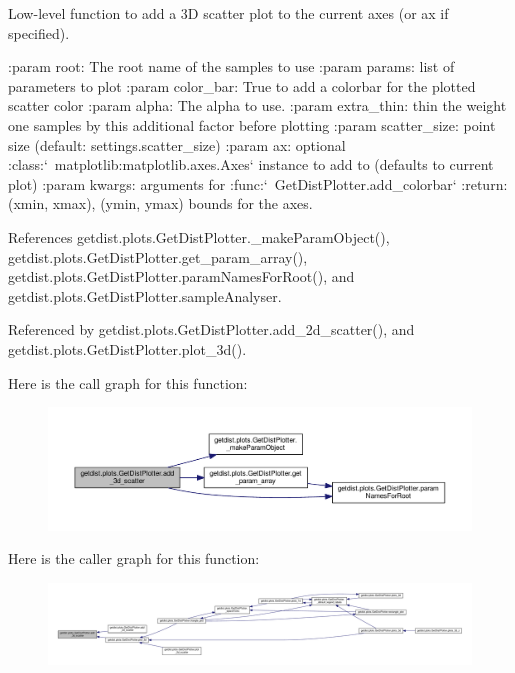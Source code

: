 \begin{DoxyVerb}Low-level function to add a 3D scatter plot to the current axes (or ax if specified).

:param root: The root name of the samples to use
:param params:  list of parameters to plot
:param color_bar: True to add a colorbar for the plotted scatter color
:param alpha: The alpha to use.
:param extra_thin: thin the weight one samples by this additional factor before plotting
:param scatter_size: point size (default: settings.scatter_size)
:param ax: optional :class:`~matplotlib:matplotlib.axes.Axes` instance to add to (defaults to current plot)
:param kwargs: arguments for :func:`~GetDistPlotter.add_colorbar`
:return: (xmin, xmax), (ymin, ymax) bounds for the axes.
\end{DoxyVerb}
 

References getdist.\+plots.\+Get\+Dist\+Plotter.\+\_\+make\+Param\+Object(), getdist.\+plots.\+Get\+Dist\+Plotter.\+get\+\_\+param\+\_\+array(), getdist.\+plots.\+Get\+Dist\+Plotter.\+param\+Names\+For\+Root(), and getdist.\+plots.\+Get\+Dist\+Plotter.\+sample\+Analyser.



Referenced by getdist.\+plots.\+Get\+Dist\+Plotter.\+add\+\_\+2d\+\_\+scatter(), and getdist.\+plots.\+Get\+Dist\+Plotter.\+plot\+\_\+3d().

Here is the call graph for this function\+:
\nopagebreak
\begin{figure}[H]
\begin{center}
\leavevmode
\includegraphics[width=350pt]{classgetdist_1_1plots_1_1GetDistPlotter_aef375df68dd9f9b2c7fa0b08ae851579_cgraph}
\end{center}
\end{figure}
Here is the caller graph for this function\+:
\nopagebreak
\begin{figure}[H]
\begin{center}
\leavevmode
\includegraphics[width=350pt]{classgetdist_1_1plots_1_1GetDistPlotter_aef375df68dd9f9b2c7fa0b08ae851579_icgraph}
\end{center}
\end{figure}
\mbox{\label{classgetdist_1_1plots_1_1GetDistPlotter_a624c60e696a6309dc60b7f67a168d65a}} 

